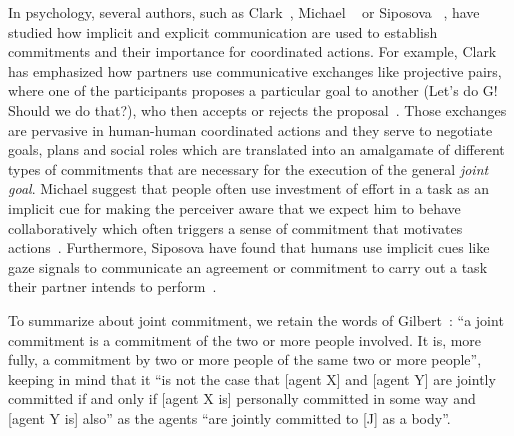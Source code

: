 \documentclass[a4paper,11pt,twoside]{StyleThese}
\begin{document}
In psychology, several authors, such as Clark~\cite{clark_2006_social}, Michael \etal~\cite{michael2016} or Siposova \etal~\cite{siposova_2018_communicative}, have studied how implicit and explicit communication are used to establish commitments and their importance for coordinated actions. For example, Clark has emphasized how partners use communicative exchanges like projective pairs, where one of the participants proposes a particular goal to another (Let’s do G! Should we do that?), who then accepts or rejects the proposal~\cite{clark_2006_social}. Those exchanges are pervasive in human-human coordinated actions and they serve to negotiate goals, plans and social roles which are translated into an amalgamate of different types of commitments that are necessary for the execution of the general \textit{joint goal}. Michael \etal{} suggest that people often use investment of effort in a task as an implicit cue for making the perceiver aware that we expect him to behave collaboratively which often triggers a sense of commitment that motivates actions~\cite{michael2016}. Furthermore, Siposova \etal{} have found that humans use implicit cues like gaze signals to communicate an agreement or commitment to carry out a task their partner intends to perform~\cite{siposova_2018_communicative}.

To summarize about joint commitment, we retain the words of Gilbert~\cite[p.~7]{gilbert_2013_joint}: ``a joint commitment is a commitment of the two or more people involved. It is, more fully, a commitment by two or more people of the same two or more people'', keeping in mind that it ``is not the case that [agent X] and [agent Y] are jointly committed if and only if [agent X is] personally committed in some way and [agent Y is] also'' as the agents ``are jointly committed to [J] as a body''.
\end{document}
